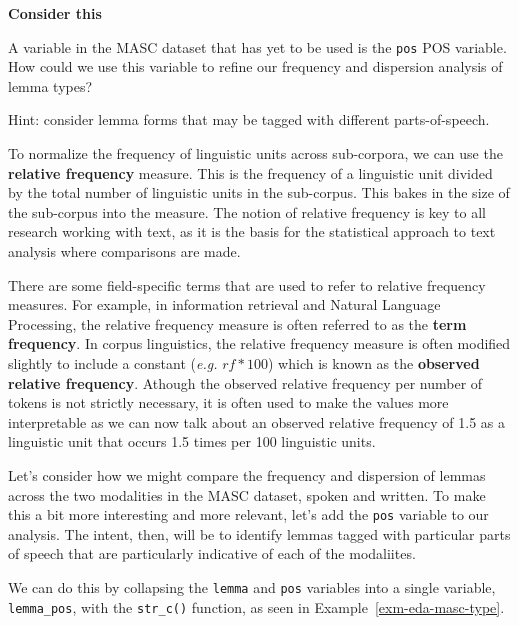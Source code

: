 \documentclass[
  letterpaper,
  DIV=11,
  numbers=noendperiod]{scrreprt}
\theoremstyle{definition}
\theoremstyle{remark}
\begin{document}
\begin{tcolorbox}[enhanced jigsaw, leftrule=.75mm, colframe=quarto-callout-color-frame, colback=white, rightrule=.15mm, opacityback=0, arc=.35mm, breakable, bottomrule=.15mm, left=2mm, toprule=.15mm]

\textbf{ Consider this}

A variable in the MASC dataset that has yet to be used is the
\texttt{pos} POS variable. How could we use this variable to refine our
frequency and dispersion analysis of lemma types?

Hint: consider lemma forms that may be tagged with different
parts-of-speech.

\end{tcolorbox}

To normalize the frequency of linguistic units across sub-corpora, we
can use the \textbf{relative frequency} measure. This is the frequency
of a linguistic unit divided by the total number of linguistic units in
the sub-corpus. This bakes in the size of the sub-corpus into the
measure. The notion of relative frequency is key to all research working
with text, as it is the basis for the statistical approach to text
analysis where comparisons are made.

There are some field-specific terms that are used to refer to relative
frequency measures. For example, in information retrieval and Natural
Language Processing, the relative frequency measure is often referred to
as the \textbf{term frequency}. In corpus linguistics, the relative
frequency measure is often modified slightly to include a constant
(\emph{e.g.} \(rf * 100\)) which is known as the \textbf{observed
relative frequency}. Athough the observed relative frequency per number
of tokens is not strictly necessary, it is often used to make the values
more interpretable as we can now talk about an observed relative
frequency of 1.5 as a linguistic unit that occurs 1.5 times per 100
linguistic units.

Let's consider how we might compare the frequency and dispersion of
lemmas across the two modalities in the MASC dataset, spoken and
written. To make this a bit more interesting and more relevant, let's
add the \texttt{pos} variable to our analysis. The intent, then, will be
to identify lemmas tagged with particular parts of speech that are
particularly indicative of each of the modaliites.

We can do this by collapsing the \texttt{lemma} and \texttt{pos}
variables into a single variable, \texttt{lemma\_pos}, with the
\texttt{str\_c()} function, as seen in Example~\ref{exm-eda-masc-type}.
\end{document}
